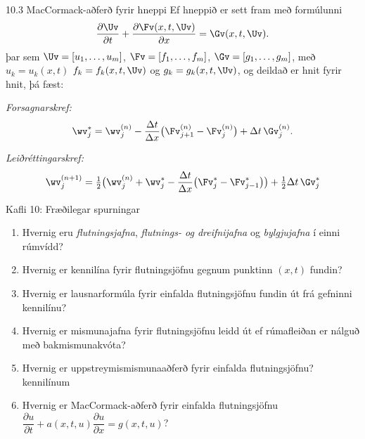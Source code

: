 \begin{frame}{10.3 MacCormack-aðferð fyrir hneppi} 
Ef hneppið er sett fram með formúlunni
$$
\dfrac{\partial \Uv}{\partial t}
+\dfrac{\partial \Fv(x,t,\Uv)}{\partial x}=\Gv(x,t,\Uv).
$$
þar sem $\Uv=[u_1,\dots,u_m]$, $\Fv=[f_1,\dots,f_m]$,
$\Gv=[g_1,\dots,g_m]$,  með $u_k=u_k(x,t)$
$f_k=f_k(x,t,\Uv)$ og $g_k=g_k(x,t,\Uv)$,
og deildað er hnit fyrir hnit, þá fæst:

\smallskip
{\it Forsagnarskref:} 
$$
\wv_j^*=\wv_j^{(n)}-\dfrac{\Delta t}{\Delta x}\big( 
\Fv_{j+1}^{(n)}-\Fv_j^{(n)}\big)+\Delta t\, \Gv_j^{(n)}.
$$

\smallskip
{\it Leiðréttingarskref:}
$$
\wv_j^{(n+1)}=\tfrac 12\big(\wv_j^{(n)} +\wv_j^*-\dfrac{\Delta t}{\Delta x}
\big(\Fv_j^*-\Fv_{j-1}^*\big) \big)+\tfrac 12 \Delta t\, \Gv_j^*
$$
\end{frame}


\begin{frame}{Kafli 10: Fræðilegar spurningar}
\begin{enumerate}
  \item Hvernig eru {\it flutningsjafna}, {\it flutnings- og
      dreifnijafna} og {\it bylgjujafna} í einni rúmvídd?
  \item Hvernig er kennilína fyrir flutningsjöfnu gegnum punktinn
    $(x,t)$ fundin? 
  \item Hvernig er lausnarformúla fyrir einfalda flutningsjöfnu fundin
    út frá gefninni kennilínu?
  \item Hvernig er mismunajafna fyrir flutningsjöfnu leidd út  ef
    rúmafleiðan er nálguð með bakmismunakvóta?
  \item Hvernig er uppstreymismismunaaðferð fyrir einfalda
    flutningsjöfnu? 
kennilínum
  \item Hvernig er MacCormack-aðferð fyrir einfalda flutningsjöfnu
$\dfrac{\partial u}{\partial t}
+a(x,t,u)\dfrac{\partial u}{\partial x}=g(x,t,u)$?
\end{enumerate}
\end{frame}
